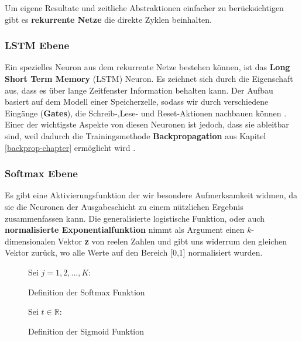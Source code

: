             \noindent
            Um eigene Resultate und zeitliche Abstraktionen einfacher zu berücksichtigen gibt es \textbf{rekurrente Netze} die direkte Zyklen beinhalten.

            \subsubsection*{LSTM Ebene} \label{lstm-definition}
                Ein spezielles Neuron aus dem rekurrente Netze bestehen können, ist das \textbf{Long Short Term Memory} (LSTM) Neuron\cite{lstm}. Es zeichnet sich durch die Eigenschaft aus, dass es über lange Zeitfenster Information behalten kann. Der Aufbau basiert auf dem Modell einer Speicherzelle, sodass wir durch verschiedene Eingänge (\textbf{Gates}), die Schreib-,Lese- und Reset-Aktionen nachbauen können \cite{lstm-new}. Einer der wichtigste Aspekte von diesen Neuronen ist jedoch, dass sie ableitbar sind, weil dadurch die Trainingsmethode \textbf{Backpropagation} aus Kapitel \ref{backprop-chapter} ermöglicht wird \cite{backprop}.

            \subsubsection*{Softmax Ebene} \label{softmax-definition}
                Es gibt eine Aktivierungsfunktion der wir besondere Aufmerksamkeit widmen, da sie die Neuronen der Ausgabeschicht zu einem nützlichen Ergebnis zusammenfassen kann. Die generalisierte logistische Funktion, oder auch \textbf{normalisierte Exponentialfunktion} nimmt als Argument einen $k$-dimensionalen Vektor \textbf{z} von reelen Zahlen und gibt uns widerrum den gleichen Vektor zurück, wo alle Werte auf den Bereich [0,1] normalisiert wurden.

            \begin{figure}[H]
                \begin{mdframed}
                    Sei $j = 1,2,...,K$: \\
                    \hspace*{45mm} 
                \end{mdframed}
                \caption{\label{softmax} Definition der Softmax Funktion}
            \end{figure}

            \begin{figure}[H]
                \begin{mdframed}
                    Sei $t \in \mathbb{R}$:\\
                    \hspace*{50mm} 
                \end{mdframed}
                \caption{\label{sigmoid} Definition der Sigmoid Funktion}
            \end{figure}

